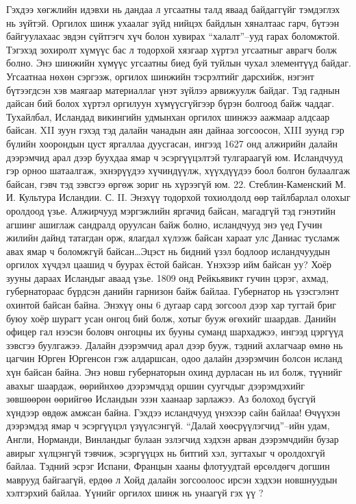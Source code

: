 Гэхдээ хөгжлийн идэвхи нь дандаа л угсаатны талд яваад байдаггүйг тэмдэглэх нь зүйтэй. Оргилох шинж ухаалаг зүйд нийцэх байдлын хяналтаас гарч, бүтээн байгуулахаас эвдэн сүйтгэгч хүч болон хувирах “халалт”–ууд гарах боломжтой. Тэгэхэд зохиролт хүмүүс бас л тодорхой хязгаар хүртэл угсаатныг аврагч болж болно.
Энэ шинжийн хүмүүс угсаатны биед буй туйлын чухал элементүүд байдаг. Угсаатнаа нөхөн сэргээж, оргилох шинжийн тэсрэлтийг дарсхийж, нэгэнт бүтээгдсэн хэв маягаар материаллаг үнэт зүйлээ арвижуулж байдаг. Тэд гаднын дайсан бий болох хүртэл оргилуун хүмүүсгүйгээр бүрэн болгоод байж чаддаг. Тухайлбал, Исландад викингийн удмынхан оргилох шинжээ аажмаар алдсаар байсан. XII зуун гэхэд тэд далайн чанадын аян дайнаа зогсоосон, XIII зуунд гэр бүлийн хоорондын цуст яргаллаа дуусгасан, ингээд 1627 онд алжирийн далайн дээрэмчид арал дээр буухдаа ямар ч эсэргүүцэлтэй тулгараагүй юм. Исландчууд гэр орноо шатаалгаж, эхнэрүүдээ хүчиндүүлж, хүүхдүүдээ боол болгон булаалгаж байсан, гэвч тэд зэвсгээ өргөж зориг нь хүрээгүй юм. 22. Стеблин-Каменский М. И. Культура Исландии. С. II.
Энэхүү тодорхой тохиолдолд өөр тайлбарлал олохыг оролдоод үзье. Алжирчууд мэргэжлийн яргачид байсан, магадгүй тэд гэнэтийн агшинг ашиглаж сандралд оруулсан байж болно, исландчууд энэ үед Гучин жилийн дайнд татагдан орж, ялагдал хүлээж байсан хараат улс Даниас тусламж авах ямар ч боломжгүй байсан…Эцэст нь бидний үзэл бодлоор исландчуудын оргилох хүчдэл цаашид ч буурах ёстой байсан. Үнэхээр ийм байсан уу? Хоёр зууны дараах Исландыг аваад үзье.
1809 онд Рейкьявикт гучин цэрэг, ахмад, губернатораас бүрдсэн данийн гарнизон байж байлаа. Губернатор нь үзэсгэлэнт охинтой байсан байна. Энэхүү оны 6 дугаар сард зогсоол дээр хар тугтай бриг буюу хоёр шурагт усан онгоц бий болж, хотыг бууж өгөхийг шаардав. Данийн офицер гал нээсэн боловч онгоцны их бууны суманд шархаджээ, ингээд цэргүүд зэвсгээ буулгажээ. Далайн дээрэмчид арал дээр бууж, тэдний ахлагчаар өмнө нь цагчин Юрген Юргенсон гэж алдаршсан, одоо далайн дээрэмчин болсон исланд хүн байсан байна. Энэ новш губернаторын охинд дурласан нь ил болж, түүнийг авахыг шаардаж, өөрийнхөө дээрэмчдэд оршин суугчдыг дээрэмдэхийг зөвшөөрөн өөрийгөө Исландын эзэн хаанаар зарлажээ. Аз болоход бүсгүй хүндээр өвдөж амжсан байна. Гэхдээ исландчууд үнэхээр сайн байлаа! Өчүүхэн дээрэмдэд ямар ч эсэргүүцэл үзүүлсэнгүй. “Далай хөөсрүүлэгчид”–ийн удам, Англи, Норманди, Винландыг булаан эзлэгчид хэдхэн арван дээрэмчдийн бузар авирыг хүлцэнгүй тэвчиж, эсэргүүцэх нь битгий хэл, зугтахыг ч оролдохгүй байлаа. Тэдний эсрэг Испани, Францын хааны флотуудтай өрсөлдөгч догшин маврууд байгаагүй, ердөө л Хойд далайн зогсоолоос ирсэн хэдхэн новшнуудын хэлтэрхий байлаа. Үүнийг оргилох шинж нь унаагүй гэх үү ?
